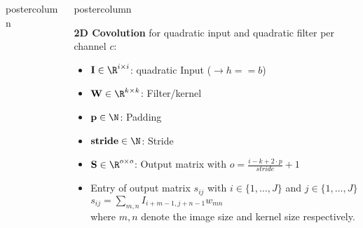 \documentclass{beamer}
\newlength{\columnheight} %
\begin{document}
\begin{frame}[fragile]{}
\begin{columns}
\begin{column}{.31\textwidth}
\begin{beamercolorbox}[center]{postercolumn}
\begin{minipage}{.98\textwidth}
{%
				}
			\end{minipage}
		\end{beamercolorbox}
	\end{column}
	\begin{column}{.31\textwidth}
		\begin{beamercolorbox}[center]{postercolumn}
			\begin{minipage}{.98\textwidth}
				\parbox[t][\columnheight]{\textwidth}{
% 
% 
\begin{myblock}{}
\textbf{2D Covolution} for quadratic input and quadratic filter per channel $c$:
\begin{itemize}
\item[] $\mathbf{I} \in \R^{i \times i}$: quadratic Input ($\rightarrow h == b$)
\item[] $\mathbf{W} \in \R^{k \times k}$: Filter/kernel 
\item[] $\mathbf{p} \in \N$: Padding
\item[] $\mathbf{stride} \in \N$: Stride
\item[] $\mathbf{S} \in \R^{o \times o}$: Output matrix with 
$o = \frac{i - k + 2 \cdot p}{stride} + 1$ \\
\item[] Entry of output matrix $s_{ij}$ with $i \in \{1, \dots, J\}$ and $j \in \{1, \dots, J\}$ \\
$s_{ij} = \sum_{m,n} I_{i+m-1, j+n-1} w_{mn}$ \\
where $m,n$ denote the image size and kernel size respectively.
\end{itemize}
\end{myblock}


}
\end{minipage}
\end{beamercolorbox}
\end{column}
\end{columns}
\end{frame}
\end{document}
